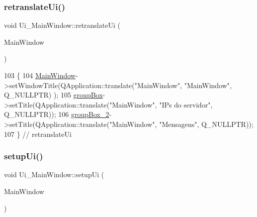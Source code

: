 \subsubsection{\texorpdfstring{retranslate\+Ui()}{retranslateUi()}}
{\footnotesize\ttfamily void Ui\+\_\+\+Main\+Window\+::retranslate\+Ui (\begin{DoxyParamCaption}\item[{Q\+Main\+Window $\ast$}]{Main\+Window }\end{DoxyParamCaption})\hspace{0.3cm}{\ttfamily [inline]}}


\begin{DoxyCode}
103     \{
104         \mbox{\hyperlink{class_main_window}{MainWindow}}->setWindowTitle(QApplication::translate(\textcolor{stringliteral}{"MainWindow"}, \textcolor{stringliteral}{"MainWindow"}, Q\_NULLPTR)
      );
105         \mbox{\hyperlink{class_ui___main_window_aef7cb3be8cecfc9aaf98f036a98781ce}{groupBox}}->setTitle(QApplication::translate(\textcolor{stringliteral}{"MainWindow"}, \textcolor{stringliteral}{"IPs do servidor"}, Q\_NULLPTR));
106         \mbox{\hyperlink{class_ui___main_window_abb28acde35ffce4d0e6152579df2cbc3}{groupBox\_2}}->setTitle(QApplication::translate(\textcolor{stringliteral}{"MainWindow"}, \textcolor{stringliteral}{"Mensagens"}, Q\_NULLPTR));
107     \} \textcolor{comment}{// retranslateUi}
\end{DoxyCode}
\mbox{\label{class_ui___main_window_acf4a0872c4c77d8f43a2ec66ed849b58}} 
\subsubsection{\texorpdfstring{setup\+Ui()}{setupUi()}}
{\footnotesize\ttfamily void Ui\+\_\+\+Main\+Window\+::setup\+Ui (\begin{DoxyParamCaption}\item[{Q\+Main\+Window $\ast$}]{Main\+Window }\end{DoxyParamCaption})\hspace{0.3cm}{\ttfamily [inline]}}


